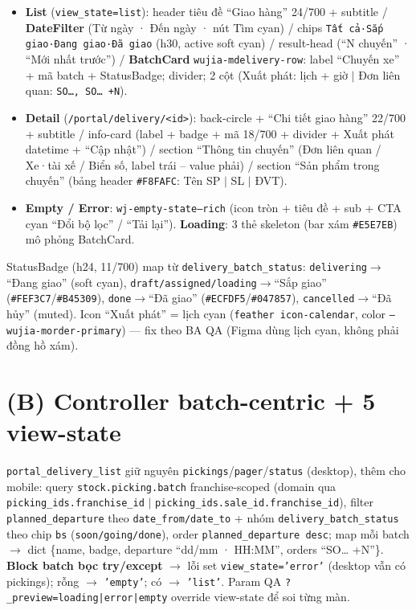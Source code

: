\begin{itemize}
  \item \textbf{List} (\texttt{view\_state=list}): header tiêu đề ``Giao hàng'' 24/700 + subtitle / \textbf{DateFilter} (Từ ngày · Đến ngày · nút Tìm cyan) / chips \texttt{Tất cả·Sắp giao·Đang giao·Đã giao} (h30, active soft cyan) / result-head (``N chuyến'' · ``Mới nhất trước'') / \textbf{BatchCard} \texttt{wujia-mdelivery-row}: label ``Chuyến xe'' + mã batch + StatusBadge; divider; 2 cột (Xuất phát: lịch + giờ \(|\) Đơn liên quan: \texttt{SO…, SO… +N}).
  \item \textbf{Detail} (\texttt{/portal/delivery/<id>}): back-circle + ``Chi tiết giao hàng'' 22/700 + subtitle / info-card (label + badge + mã 18/700 + divider + Xuất phát datetime + ``Cập nhật'') / section ``Thông tin chuyến'' (Đơn liên quan / Xe·tài xế / Biển số, label trái -- value phải) / section ``Sản phẩm trong chuyến'' (bảng header \texttt{\#F8FAFC}: Tên SP \(|\) SL \(|\) ĐVT).
  \item \textbf{Empty / Error}: \texttt{wj-empty-state--rich} (icon tròn + tiêu đề + sub + CTA cyan ``Đổi bộ lọc'' / ``Tải lại''). \textbf{Loading}: 3 thẻ skeleton (bar xám \texttt{\#E5E7EB}) mô phỏng BatchCard.
\end{itemize}

StatusBadge (h24, 11/700) map từ \texttt{delivery\_batch\_status}: \texttt{delivering}\(\rightarrow\)``Đang giao'' (soft cyan), \texttt{draft/assigned/loading}\(\rightarrow\)``Sắp giao'' (\texttt{\#FEF3C7}/\texttt{\#B45309}), \texttt{done}\(\rightarrow\)``Đã giao'' (\texttt{\#ECFDF5}/\texttt{\#047857}), \texttt{cancelled}\(\rightarrow\)``Đã hủy'' (muted). Icon ``Xuất phát'' = lịch cyan (\texttt{feather icon-calendar}, color \texttt{--wujia-morder-primary}) --- fix theo BA QA (Figma dùng lịch cyan, không phải đồng hồ xám).

\section{(B) Controller batch-centric + 5 view-state}

\texttt{portal\_delivery\_list} giữ nguyên \texttt{pickings}/\texttt{pager}/\texttt{status} (desktop), thêm cho mobile: query \texttt{stock.picking.batch} franchise-scoped (domain qua \texttt{picking\_ids.franchise\_id} \(|\) \texttt{picking\_ids.sale\_id.franchise\_id}), filter \texttt{planned\_departure} theo \texttt{date\_from/date\_to} + nhóm \texttt{delivery\_batch\_status} theo chip \texttt{bs} (\texttt{soon/going/done}), order \texttt{planned\_departure desc}; map mỗi batch \(\rightarrow\) dict \{name, badge, departure ``dd/mm · HH:MM'', orders ``SO… +N''\}. \textbf{Block batch bọc try/except} \(\rightarrow\) lỗi set \texttt{view\_state='error'} (desktop vẫn có pickings); rỗng \(\rightarrow\) \texttt{'empty'}; có \(\rightarrow\) \texttt{'list'}. Param QA \texttt{?\_preview=loading|error|empty} override view-state để soi từng màn.

